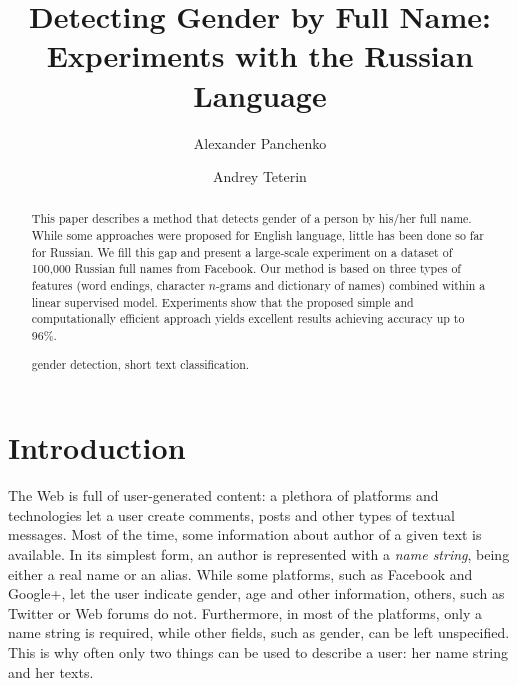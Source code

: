 \documentclass[runningheads,a4paper]{llncs}
\newcommand{\keywords}[1]{\par\addvspace\baselineskip
\noindent\keywordname\enspace\ignorespaces#1}
\begin{document}
\mainmatter  

\title{Detecting Gender by Full Name: Experiments with the Russian Language}


\author{Alexander Panchenko \and Andrey Teterin  }






\toctitle{ \ldots } 
\tocauthor{ \ldots }
\maketitle


\begin{abstract}

This paper describes a method that detects gender of a person by his/her full name. While some approaches were proposed for English language, little has been done so far for Russian. We fill this gap and present a large-scale experiment on a dataset of 100,000 Russian full names from Facebook. Our method is based on three types of features (word endings, character $n$-grams and dictionary of names) combined within a linear supervised model. Experiments show that the proposed simple and computationally efficient approach yields excellent results achieving accuracy up to 96\%.


\keywords{ gender detection, short text classification.}
\end{abstract}

\section{Introduction}

The Web is full of user-generated content: a plethora of platforms and technologies let a user create comments, posts and other types of textual messages. Most of the time, some information about author of a given text is available. In its simplest form, an author is represented with a \textit{name string}, being either a real name or an alias. While some platforms, such as Facebook and Google+, let the user indicate gender, age and other information, others, such as Twitter or Web forums do not. Furthermore, in most of the platforms, only a name string is required, while other fields, such as gender, can be left unspecified. This is why often only two things can be used to describe a user: her name string and her texts.
\end{document}
